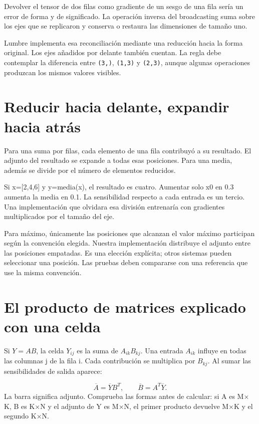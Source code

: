 \documentclass[12pt,a4paper,oneside]{report}
\begin{document}
Devolver el tensor de dos filas como gradiente de un sesgo de una fila sería un error de forma y de significado. La operación inversa del broadcasting suma sobre los ejes que se replicaron y conserva o restaura las dimensiones de tamaño uno.

Lumbre implementa esa reconciliación mediante una reducción hacia la forma original. Los ejes añadidos por delante también cuentan. La regla debe contemplar la diferencia entre \texttt{(3,)}, \texttt{(1,3)} y \texttt{(2,3)}, aunque algunas operaciones produzcan los mismos valores visibles.

\section{Reducir hacia delante, expandir hacia atrás}
Para una suma por filas, cada elemento de una fila contribuyó a su resultado. El adjunto del resultado se expande a todas esas posiciones. Para una media, además se divide por el número de elementos reducidos.

Si x=[2,4,6] y y=media(x), el resultado es cuatro. Aumentar solo x0 en 0.3 aumenta la media en 0.1. La sensibilidad respecto a cada entrada es un tercio. Una implementación que olvidara esa división entrenaría con gradientes multiplicados por el tamaño del eje.

Para máximo, únicamente las posiciones que alcanzan el valor máximo participan según la convención elegida. Nuestra implementación distribuye el adjunto entre las posiciones empatadas. Es una elección explícita; otros sistemas pueden seleccionar una posición. Las pruebas deben compararse con una referencia que use la misma convención.

\section{El producto de matrices explicado con una celda}
Si $Y=AB$, la celda $Y_{ij}$ es la suma de $A_{ik}B_{kj}$. Una entrada $A_{ik}$ influye en todas las columnas j de la fila i. Cada contribución se multiplica por $B_{kj}$. Al sumar las sensibilidades de salida aparece:

\[
\overline A=\overline Y B^T,\qquad
\overline B=A^T\overline Y.
\]
La barra significa adjunto. Comprueba las formas antes de calcular: si A es M\ensuremath{\times}K, B es K\ensuremath{\times}N y el adjunto de Y es M\ensuremath{\times}N, el primer producto devuelve M\ensuremath{\times}K y el segundo K\ensuremath{\times}N.
\end{document}
